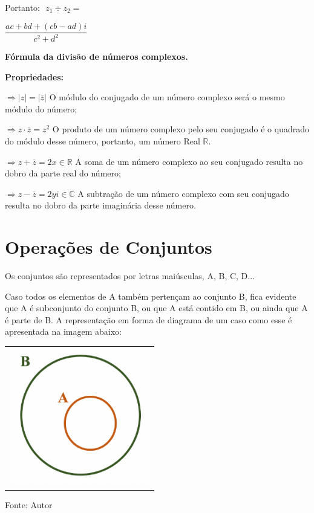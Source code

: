 \begin{multicols*}{2}
    Portanto: $ \, \, z_1 \div z_2= $

    $\dfrac{ac + bd + (cb - ad)i}{c^2 + d^2}$

    \textbf{Fórmula da divisão de números complexos.}

    \textbf{Propriedades:}

    $\Rightarrow |z| = |\overline{z}| $ O módulo do conjugado de um número complexo será o mesmo módulo do número;

    $\Rightarrow z \cdot \overline{z} = z^2 $ O produto de um número complexo pelo seu conjugado é o quadrado do módulo desse número, portanto, um número Real $\mathbb{R}.$

    $\Rightarrow z + \overline{z} = 2 x \in \mathbb{R} $ A soma de um número complexo ao seu conjugado resulta no dobro da parte real do número;

    $\Rightarrow z - \overline{z} = 2yi \in \mathbb{C} $ A subtração de um número complexo com seu conjugado resulta no dobro da parte imaginária desse número.


    \section*{Operações de Conjuntos}

    Os conjuntos são representados por letras maiúsculas, A, B, C, D...

    Caso todos os elementos de A também pertençam ao conjunto B, fica evidente que A é subconjunto do conjunto B, ou que A está contido em B, ou ainda que A é parte de B. A representação em forma de diagrama de um caso como esse é apresentada na imagem abaixo:

    \begin{tabular}{@{}c@{}}
        \includegraphics[height=60mm]{assets/Conjunto Contido.png}
    \end{tabular}

    Fonte: Autor\\


\end{multicols*}
